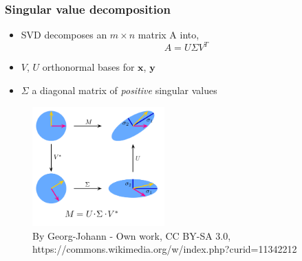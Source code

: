 \documentclass[xcolor={dvipsnames}]{beamer}
\begin{document}
\begin{frame}
\frametitle{Singular value decomposition}
\begin{itemize}
    \item SVD decomposes an $m \times n$ matrix A into,
\begin{equation}
A = U \Sigma V^T
\end{equation}
    \item $V$, $U$ orthonormal bases for $\mathbf{x}$, $\mathbf{y}$
    \item $\Sigma$ a diagonal matrix of \emph{positive} singular values
\end{itemize}
\begin{figure}
\includegraphics[width=2in]{figs/Singular-Value-Decomposition.png}
\caption{By Georg-Johann - Own work, CC BY-SA 3.0, https://commons.wikimedia.org/w/index.php?curid=11342212}
\end{figure}
\end{frame}


\end{document}
